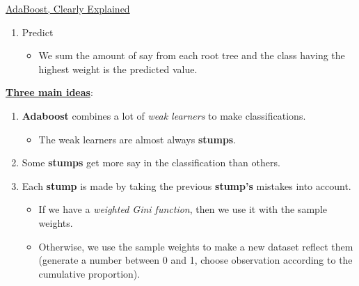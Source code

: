 \documentclass[12pt, titlepage, french]{report}
\begin{document}
\begin{YTB_SUMM_AUTO_NUMB}[label = {SQ-Boo-Ada}]{\href{https://www.youtube.com/watch?v=LsK-xG1cLYA&feature=youtu.be}{AdaBoost, Clearly Explained}}
\begin{enumerate}[leftmargin = *]
\begin{itemize}[leftmargin = *]
	\item	We then normalize them so they're between 0 and 1 with $\frac{\text{sample weight}}{\text{sum of the new sample weights}}$.
	\item	Theoretically, these weights could be used to calculate the weighted Gini index.
	\item	Instead, we make a new sample of the same size picking observations according to their weight using the inversion method.
		\begin{itemize}[leftmargin = *]
		\item	Thus, some observations could (should) be repeated in the new sample set.
		\item	Then, we give equal weights to this new sample.
		\item	Because some observations will be repeated, they will have a higher weight as the will be treated like a "block" with a large penalty for misclassification.
		\end{itemize}
\end{itemize}

\item	Predict
\begin{itemize}[leftmargin = *]
	\item	We sum the amount of say from each root tree and the class having the highest weight is the predicted value.
\end{itemize}
\end{enumerate}

\tcbline

\textbf{\underline{Three main ideas}}:
\begin{enumerate}[leftmargin = *]
	\item	\textbf{Adaboost} combines a lot of \textit{weak learners} to make classifications.
		\begin{itemize}[leftmargin = *]
		\item	The weak learners are almost always \textbf{stumps}.
		\end{itemize}
	\item	Some \textbf{stumps} get more say in the classification than others.
	\item	Each \textbf{stump} is made by taking the previous \textbf{stump's} mistakes into account.
		\begin{itemize}[leftmargin = *]
		\item	If we have a \textit{weighted Gini function}, then we use it with the sample weights.
		\item	Otherwise, we use the sample weights to make a new dataset reflect them (generate  a number between 0 and 1, choose observation according to the cumulative proportion).
		\end{itemize}
\end{enumerate}
\end{YTB_SUMM_AUTO_NUMB}
\end{document}
